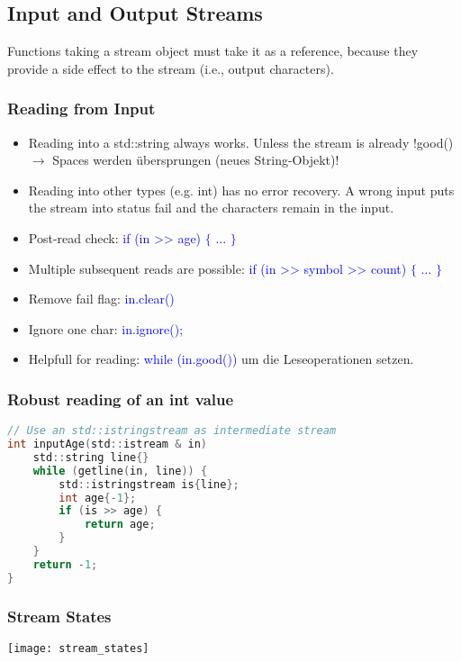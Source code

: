 \subsection{Input and Output Streams}
Functions taking a stream object must take it as a reference, because they provide a side effect to the stream (i.e., output characters).
\subsubsection{Reading from Input}
\begin{itemize}
    \item Reading into a std::string always works. Unless the stream is already !good() $\rightarrow$ Spaces werden übersprungen (neues String-Objekt)!
    \item Reading into other types (e.g. int) has no error recovery. A wrong input puts the stream into status fail and the characters remain in the input.
    \item Post-read check: \textcolor{blue}{if (in >> age) $\{$ ... $\}$}
    \item Multiple subsequent reads are possible: \textcolor{blue}{if (in >> symbol >> count) $\{$ ... $\}$}
    \item Remove fail flag: \textcolor{blue}{in.clear()}
    \item Ignore one char: \textcolor{blue}{in.ignore();}
    \item Helpfull for reading: \textcolor{blue}{while (in.good())} um die Leseoperationen setzen.
\end{itemize}

\subsubsection{Robust reading of an int value}
\begin{lstlisting}[style=frame, style= linenumbers, language=C]
// Use an std::istringstream as intermediate stream
int inputAge(std::istream & in)
    std::string line{}
    while (getline(in, line)) {
        std::istringstream is{line};
        int age{-1};
        if (is >> age) {
            return age;
        }
    }
    return -1;
}
\end{lstlisting}

\subsubsection{Stream States}
\texttt{[image: stream\_states]}
